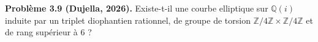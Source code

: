 \textbf{Problème 3.9 (Dujella, 2026).} Existe-t-il une courbe elliptique sur $\mathbb{Q}(i)$ induite par un triplet diophantien rationnel, de groupe de torsion $\mathbb{Z}/4\mathbb{Z}\times\mathbb{Z}/4\mathbb{Z}$ et de rang supérieur à 6 ?
